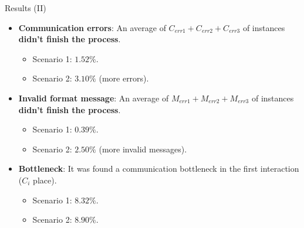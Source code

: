 \documentclass[xcolor=svgnames]{beamer}
\begin{document}
  \begin{frame}{ Results (II)}
      \begin{itemize}
         \item <1-> \textbf{Communication errors}: An average of  \textbf{$C_{err1}+C_{err2}+C_{err3}$} of instances \textbf{didn’t finish the process}.
            \begin{itemize}
              \item Scenario 1: $1.52\%$.
              \item Scenario 2: $3.10\%$ (more errors).
            \end{itemize}
         \item <2-> \textbf{Invalid format message}: An average of  \textbf{$M_{err1}+M_{err2}+M_{err3}$} of instances \textbf{didn’t finish the process}.
            \begin{itemize}
              \item Scenario 1: $0.39\%$.
              \item Scenario 2: $2.50\%$ (more invalid messages).
            \end{itemize}
        \item <3->\textbf{Bottleneck}: It was found a communication bottleneck in the first interaction ($C_i$ place).
            \begin{itemize}
              \item Scenario 1: $8.32\%$.
              \item Scenario 2: $8.90\%$.
            \end{itemize}

      \end{itemize}
  \end{frame}
  



\end{document}
